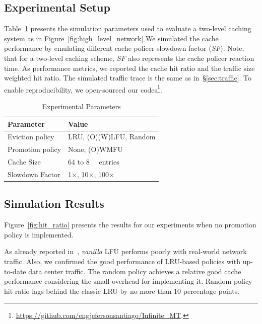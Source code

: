 \subsection{Experimental Setup}
Table~\ref{tab:setup} presents the simulation parameters used to evaluate a two-level caching system as in Figure~\ref{fig:high_level_network}
We simulated the cache performance by emulating different cache policer slowdown factor ($SF$).
Note, that for a two-level caching scheme, $SF$ also represents the cache policer reaction time.
As performance metrics, we reported the cache hit ratio and the traffic size weighted hit ratio.
The simulated traffic trace is the same as in~\S\ref{sec:traffic}.
To enable reproducibility, we open-sourced our codes\footnote{\url{https://github.com/engjefersonsantiago/Infinite_MT}.}.


\begin{table}[h]
	\centering
	\caption{Experimental Parameters}
	\label{tab:setup}
	\begin{tabular}{|l|l|}
		\hline
		\textbf{Parameter}       & \textbf{Value}   \\
		\hline
		Eviction policy            & LRU, (O)(W)LFU, Random			    \\
		Promotion policy            & None, (O)WMFU			    \\
		Cache Size              & 64 to \SI{8}{\kilo\nothing} entries  \\
		Slowdown Factor         & 1$\times$, 10$\times$, 100$\times$        \\
		\hline
	\end{tabular}
\end{table}

\subsection{Simulation Results}
Figure~\ref{fig:hit_ratio} presents the results for our experiments when no promotion policy is implemented.

As already reported in~\cite{Kim:09}, \textit{vanilla} LFU performs poorly with real-world network traffic.
Also, we confirmed the good performance of LRU-based policies with up-to-date data center traffic. 
The random policy achieves a relative good cache performance considering the small overhead for implementing it.
Random policy hit ratio lags behind the classic LRU by no more than 10 percentage points.

